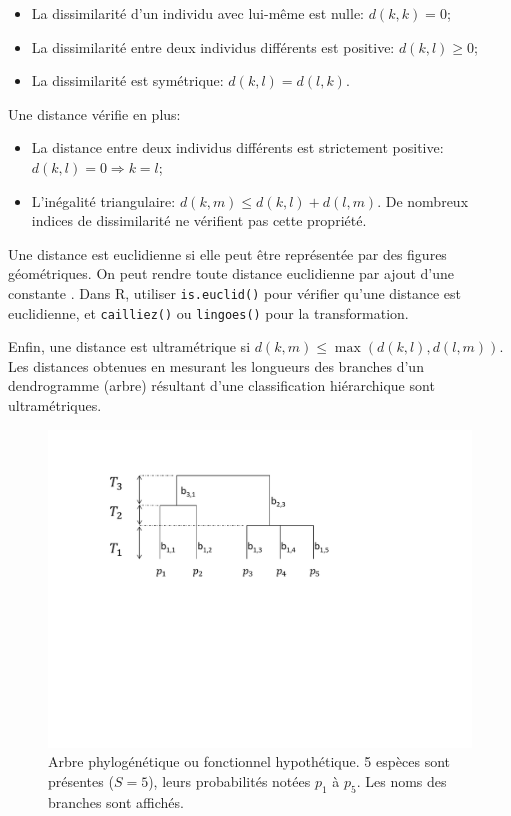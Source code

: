 \documentclass[
  11pt,
  french,
  a4paper,
  extrafontsizes,onecolumn,openright
  ]{memoir}
\providecommand{\tightlist}{%
  \setlength{\itemsep}{0pt}\setlength{\parskip}{0pt}}
\begin{document}
\begin{itemize}
\tightlist
\item
  La dissimilarité d'un individu avec lui-même est nulle: \(d\left(k,k\right)=0\);
\item
  La dissimilarité entre deux individus différents est positive: \(d\left(k,l\right)\ge 0\);
\item
  La dissimilarité est symétrique: \(d\left(k,l\right)=d\left(l,k\right)\).
\end{itemize}

Une distance vérifie en plus:

\begin{itemize}
\tightlist
\item
  La distance entre deux individus différents est strictement positive: \(d\left(k,l\right)=0\Rightarrow k=l\);
\item
  L'inégalité triangulaire: \(d\left(k,m\right)\le d\left(k,l\right)+d\left(l,m\right)\).
  De nombreux indices de dissimilarité ne vérifient pas cette propriété.
\end{itemize}

Une distance est euclidienne si elle peut être représentée par des figures géométriques.
On peut rendre toute distance euclidienne par ajout d'une constante \autocite{Lingoes1971,Cailliez1983}.
Dans R, utiliser \texttt{is.euclid()} pour vérifier qu'une distance est euclidienne, et \texttt{cailliez()} ou \texttt{lingoes()} pour la transformation.

Enfin, une distance est ultramétrique si \(d\left(k,m\right) \le \max\left(d\left(k,l\right),d\left(l,m\right)\right)\).
Les distances obtenues en mesurant les longueurs des branches d'un dendrogramme (arbre) résultant d'une classification hiérarchique sont ultramétriques.



\scriptsize

\begin{figure}

{\centering \includegraphics[width=0.8\linewidth]{images/ArbreA} 

}

\caption{Arbre phylogénétique ou fonctionnel hypothétique. 5 espèces sont présentes (\(S=5\)), leurs probabilités notées \(p_1\) à \(p_5\). Les noms des branches sont affichés.}\label{fig:ArbreA1}
\end{figure}
\end{document}
